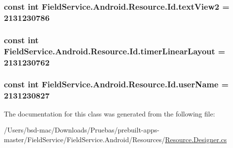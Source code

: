 \hypertarget{class_field_service_1_1_android_1_1_resource_1_1_id_a688389fd9bc2383cbe4b33c6769f402b}{
\subsubsection[{text\+View2}]{\setlength{\rightskip}{0pt plus 5cm}const int Field\+Service.\+Android.\+Resource.\+Id.\+text\+View2 = 2131230786}}\label{class_field_service_1_1_android_1_1_resource_1_1_id_a688389fd9bc2383cbe4b33c6769f402b}
\hypertarget{class_field_service_1_1_android_1_1_resource_1_1_id_a05f1370d1abd23af64c2dd483a599dbf}{
\subsubsection[{timer\+Linear\+Layout}]{\setlength{\rightskip}{0pt plus 5cm}const int Field\+Service.\+Android.\+Resource.\+Id.\+timer\+Linear\+Layout = 2131230762}}\label{class_field_service_1_1_android_1_1_resource_1_1_id_a05f1370d1abd23af64c2dd483a599dbf}
\hypertarget{class_field_service_1_1_android_1_1_resource_1_1_id_a05a8270baed5397986aadd34ac1c537c}{
\subsubsection[{user\+Name}]{\setlength{\rightskip}{0pt plus 5cm}const int Field\+Service.\+Android.\+Resource.\+Id.\+user\+Name = 2131230827}}\label{class_field_service_1_1_android_1_1_resource_1_1_id_a05a8270baed5397986aadd34ac1c537c}


The documentation for this class was generated from the following file\+:\begin{DoxyCompactItemize}
\item 
/\+Users/bsd-\/mac/\+Downloads/\+Pruebas/prebuilt-\/apps-\/master/\+Field\+Service/\+Field\+Service.\+Android/\+Resources/\hyperlink{_field_service_8_android_2_resources_2_resource_8designer_8cs}{Resource.\+Designer.\+cs}\end{DoxyCompactItemize}
